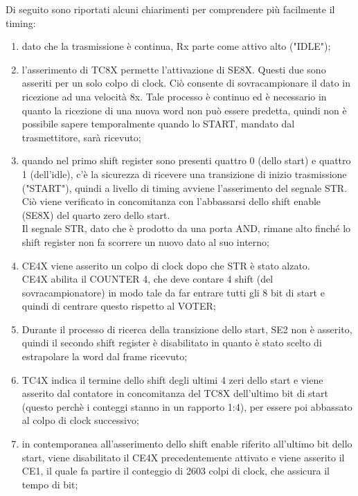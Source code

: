 \documentclass[a4paper, titlepage]{article}
\begin{document}
Di seguito sono riportati alcuni chiarimenti per comprendere più facilmente il timing:
\begin{enumerate}
    \item dato che la trasmissione è continua, Rx parte come attivo alto ("IDLE");
    \item l'asserimento di TC8X permette l'attivazione di SE8X. Questi due sono asseriti per un solo colpo di clock. Ciò consente di sovracampionare il dato in ricezione ad una velocità 8x. Tale processo è continuo ed è necessario in quanto la ricezione di una nuova word non può essere predetta, quindi non è possibile sapere temporalmente quando lo START, mandato dal trasmettitore, sarà ricevuto;
    \item quando nel primo shift register sono presenti quattro 0  (dello start) e quattro 1 (dell'idle), c'è la sicurezza di ricevere una transizione di inizio trasmissione ("START"), quindi a livello di timing avviene l'asserimento del segnale STR. Ciò viene verificato in concomitanza con l'abbassarsi dello shift enable (SE8X) del quarto zero dello start.\\Il segnale STR, dato che è prodotto da una porta AND, rimane alto finché lo shift register non fa scorrere un nuovo dato al suo interno;
    \item CE4X viene asserito un colpo di clock dopo che STR è stato alzato.\\ CE4X abilita il COUNTER 4, che deve contare 4 shift (del sovracampionatore) in modo tale da far entrare tutti gli 8 bit di start e quindi di centrare questo rispetto al VOTER;
    \item Durante il processo di ricerca della transizione dello start, SE2 non è asserito, quindi il secondo shift register è disabilitato in quanto è stato scelto di estrapolare la word dal frame ricevuto;
    \item TC4X indica il termine dello shift degli ultimi 4 zeri dello start e viene asserito dal contatore in concomitanza del TC8X dell'ultimo bit di start (questo perchè i conteggi stanno in un rapporto 1:4), per essere poi abbassato al colpo di clock successivo;
    \item in contemporanea all'asserimento dello shift enable riferito all'ultimo bit dello start, viene disabilitato il CE4X precedentemente attivato e viene asserito il CE1, il quale fa partire il conteggio di 2603 colpi di clock, che assicura il tempo di bit;

\end{enumerate}
\end{document}
